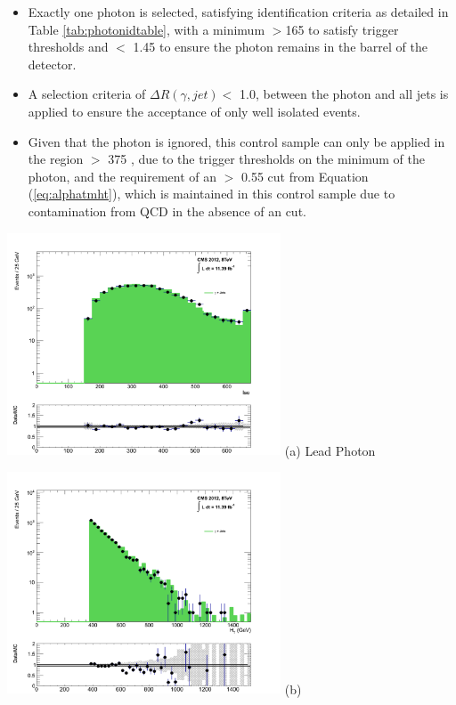 \begin{itemize}
\begin{itemize}
\item Exactly one photon is selected, satisfying identification criteria as detailed in Table \ref{tab:photonidtable}, with a minimum \pt $> $165 \GeV to satisfy trigger thresholds and \abeta $<$ 1.45 to ensure the photon remains in the barrel of the detector.
\item A selection criteria of $\Delta R(\gamma,jet) <$ 1.0, between the photon and all jets is applied to ensure the acceptance of only well isolated \gpjets events. 
\item Given that the photon is ignored, this control sample can only be applied in the \theht region $>$ 375 \GeV, due to the trigger thresholds on the minimum \pt of the photon, and the \mht requirement of an \alphat $>$ 0.55 cut from Equation (\ref{eq:alphatmht}), which is maintained in this control sample due to contamination from QCD in the absence of an \alphat cut.
\end{itemize}


\begin{minipage}{\linewidth}
\centering
\begin{minipage}{.48\textwidth}
\centering
\includegraphics[width = 3.2in]{plots/photon_leadphoton_datamc.pdf}
(a) Lead Photon \pt
\end{minipage}
\begin{minipage}{.48\textwidth}
\centering
\includegraphics[width = 3.2in]{plots/photon_ht_datamc.pdf}
(b) \theht
\end{minipage}
\end{minipage}


\end{itemize}
